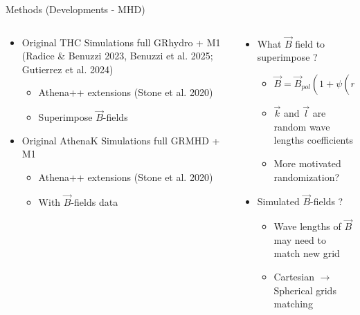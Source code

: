 \begin{frame}{Methods (Developments - MHD)}
\begin{columns}

\begin{column}{0.5\textwidth}
\begin{tcolorbox}[
    colback=white,
    colframe=blue,
    colbacktitle=blue!50!black!50,
    title=GRMHD simulations,
    fonttitle=\bfseries,
    rounded corners,
    boxrule=1pt,
    left=2mm, right=2mm, top=1mm, bottom=1mm
]
\begin{itemize}   
   \scriptsize
    \item Original THC Simulations full GRhydro + M1 (Radice \& Benuzzi 2023, Benuzzi et al. 2025; Gutierrez et al. 2024)
    \begin{itemize}
    	\item Athena++ extensions (Stone et al. 2020)
    	\item Superimpose $\vec{B}$-fields
   \end{itemize}
    \item Original AthenaK Simulations full GRMHD + M1 
    \begin{itemize}
    	\item Athena++ extensions (Stone et al. 2020)
    	\item With $\vec{B}$-fields data
   \end{itemize}

\end{itemize}

\end{tcolorbox}


\end{column}

\begin{column}{0.5\textwidth}
\vspace{-0.5cm}
\begin{tcolorbox}[
    colback=white,
    colframe=blue,
    colbacktitle=blue!50!black!50,
    title=$\vec{B}$ injection,
    fonttitle=\bfseries,
    rounded corners,`
    boxrule=1pt,
    left=2mm, right=2mm, top=1mm, bottom=1mm
]

\begin{itemize}
\item What $\vec{B}$ field to superimpose ?
 	\begin{itemize}
	\item $ \vec{B} = \vec{B}_{pol}(1+\psi(r,\theta,\phi,t ,\vec{k})) + \vec{B}_{tor}(\delta(r,t, \vec{l}))$
	\item $\vec{k}$ and $\vec{l}$  are random wave lengths coefficients  
	\item More motivated randomization?
	\end{itemize}
\item Simulated $\vec{B}$-fields ?
 	\begin{itemize}
	\item Wave lengths of $\vec{B}$ may need to match new grid
	\item Cartesian $\rightarrow$ Spherical grids matching
 	\end{itemize}


\end{itemize}
\end{tcolorbox}
\end{column}
\end{columns}
\end{frame}
